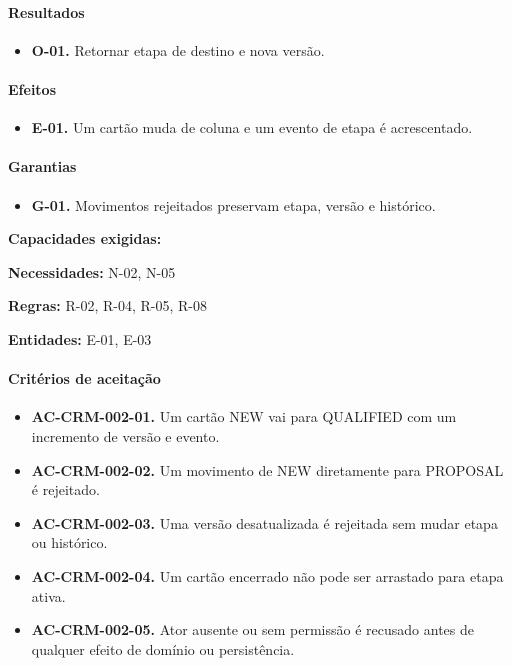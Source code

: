 \documentclass[10pt,a4paper]{article}
\begin{document}
\paragraph{Resultados}

\begin{itemize}

\item \textbf{O-01.} Retornar etapa de destino e nova versão.

\end{itemize}

\paragraph{Efeitos}

\begin{itemize}

\item \textbf{E-01.} Um cartão muda de coluna e um evento de etapa é acrescentado.

\end{itemize}

\paragraph{Garantias}

\begin{itemize}

\item \textbf{G-01.} Movimentos rejeitados preservam etapa, versão e histórico.

\end{itemize}

\textbf{Capacidades exigidas:} 

\textbf{Necessidades:} N-02, N-05

\textbf{Regras:} R-02, R-04, R-05, R-08

\textbf{Entidades:} E-01, E-03

\paragraph{Critérios de aceitação}

\begin{itemize}

\item \textbf{AC-CRM-002-01.} Um cartão NEW vai para QUALIFIED com um incremento de versão e evento.

\item \textbf{AC-CRM-002-02.} Um movimento de NEW diretamente para PROPOSAL é rejeitado.

\item \textbf{AC-CRM-002-03.} Uma versão desatualizada é rejeitada sem mudar etapa ou histórico.

\item \textbf{AC-CRM-002-04.} Um cartão encerrado não pode ser arrastado para etapa ativa.

\item \textbf{AC-CRM-002-05.} Ator ausente ou sem permissão é recusado antes de qualquer efeito de domínio ou persistência.

\end{itemize}
\end{document}
